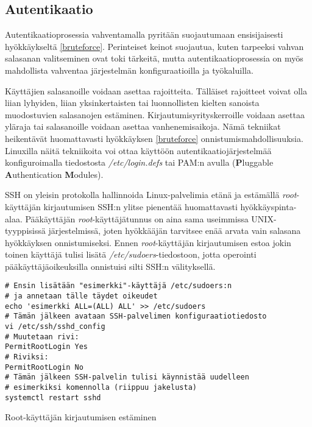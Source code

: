 \subsection{Autentikaatio}\label{autentikaatio}
Autentikaatioprosessia vahventamalla pyritään suojautumaan ensisijaisesti hyökkäykseltä \ref{bruteforce}. Perinteiset keinot suojautua, kuten tarpeeksi vahvan salasanan valitseminen ovat toki tärkeitä, mutta autentikaatioprosessia on myös mahdollista vahventaa järjestelmän konfiguraatioilla ja työkaluilla.

Käyttäjien salasanoille voidaan asettaa rajoitteita. Tälläiset rajoitteet voivat olla liian lyhyiden, liian yksinkertaisten tai luonnollisten kielten sanoista muodostuvien salasanojen estäminen. Kirjautumisyrityskerroille voidaan asettaa yläraja tai salasanoille voidaan asettaa vanhenemisaikoja. Nämä tekniikat heikentävät huomattavasti hyökkäyksen \ref{bruteforce} onnistumismahdollisuuksia. Linuxilla näitä tekniikoita voi ottaa käyttöön autentikaatiojärjestelmää konfiguroimalla tiedostosta \textit{/etc/login.defs} tai PAM:n avulla (\textbf{P}luggable \textbf{A}uthentication \textbf{M}odules).~\cite{kemp2009linux}

SSH on yleisin protokolla hallinnoida Linux-palvelimia etänä ja estämällä \textit{root}-käyttäjän kirjautumisen SSH:n ylitse pienentää huomattavasti hyökkäyspinta-alaa. Pääkäyttäjän \textit{root}-käyttäjätunnus on aina sama useimmissa UNIX-tyyppisissä järjestelmissä, joten hyökkääjän tarvitsee enää arvata vain salasana hyökkäyksen onnistumiseksi. Ennen \textit{root}-käyttäjän kirjautumisen estoa jokin toinen käyttäjä tulisi lisätä \textit{/etc/sudoers}-tiedostoon, jotta operointi pääkäyttäjäoikeuksilla onnistuisi silti SSH:n välityksellä.~\cite{sshd}~\cite{sudo}

\begin{algorithm}[tbh]
\begin{verbatim}
# Ensin lisätään "esimerkki"-käyttäjä /etc/sudoers:n
# ja annetaan tälle täydet oikeudet
echo 'esimerkki ALL=(ALL) ALL' >> /etc/sudoers
# Tämän jälkeen avataan SSH-palvelimen konfiguraatiotiedosto
vi /etc/ssh/sshd_config
# Muutetaan rivi:
PermitRootLogin Yes
# Riviksi:
PermitRootLogin No
# Tämän jälkeen SSH-palvelin tulisi käynnistää uudelleen
# esimerkiksi komennolla (riippuu jakelusta)
systemctl restart sshd
\end{verbatim}
\caption{Root-käyttäjän kirjautumisen estäminen\label{alg:disable_root_login}}
\end{algorithm}
\newpage{}

